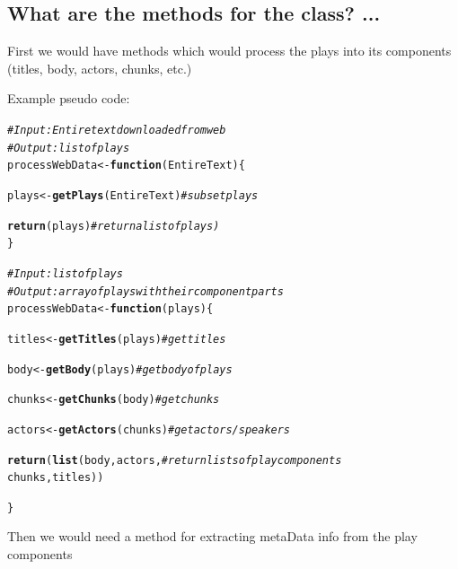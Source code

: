 \documentclass{article}\usepackage[]{graphicx}\usepackage[]{color}
\makeatletter
\newcommand{\hlcom}[1]{\textcolor[rgb]{0.678,0.584,0.686}{\textit{#1}}}%
\newcommand{\hlstd}[1]{\textcolor[rgb]{0.345,0.345,0.345}{#1}}%
\newcommand{\hlkwa}[1]{\textcolor[rgb]{0.161,0.373,0.58}{\textbf{#1}}}%
\newcommand{\hlkwb}[1]{\textcolor[rgb]{0.69,0.353,0.396}{#1}}%
\newcommand{\hlkwc}[1]{\textcolor[rgb]{0.333,0.667,0.333}{#1}}%
\newcommand{\hlkwd}[1]{\textcolor[rgb]{0.737,0.353,0.396}{\textbf{#1}}}%
\newenvironment{kframe}{%
 \def\at@end@of@kframe{}%
 \ifinner\ifhmode%
  \def\at@end@of@kframe{\end{minipage}}%
  \begin{minipage}{\columnwidth}%
 \fi\fi%
 \def\FrameCommand##1{\hskip\@totalleftmargin \hskip-\fboxsep
 \colorbox{shadecolor}{##1}\hskip-\fboxsep
     \hskip-\linewidth \hskip-\@totalleftmargin \hskip\columnwidth}%
 \MakeFramed {\advance\hsize-\width
   \@totalleftmargin\z@ \linewidth\hsize
   \@setminipage}}%
 {\par\unskip\endMakeFramed%
 \at@end@of@kframe}
\newenvironment{knitrout}{}{} %
\makeatother
\begin{document}
\subsection{What are the methods for the class? ...} %

First we would have methods which would process the plays into its components (titles, body, actors, chunks, etc.)

Example pseudo code:

\begin{knitrout}
\color{fgcolor}\begin{kframe}
\begin{alltt}
\hlcom{#Input: Entire text downloaded from web}
\hlcom{#Output: list of plays}
\hlstd{processWebData} \hlkwb{<-} \hlkwa{function}\hlstd{(}\hlkwc{EntireText}\hlstd{) \{}

    \hlstd{plays} \hlkwb{<-} \hlkwd{getPlays}\hlstd{(EntireText)}           \hlcom{#subset plays}

    \hlkwd{return}\hlstd{(plays)}                           \hlcom{#return a list of plays)   }
\hlstd{\}}

\hlcom{#Input: list of plays}
\hlcom{#Output: array of plays with their component parts}
\hlstd{processWebData} \hlkwb{<-} \hlkwa{function}\hlstd{(}\hlkwc{plays}\hlstd{) \{}

    \hlstd{titles} \hlkwb{<-} \hlkwd{getTitles}\hlstd{(plays)}              \hlcom{#get titles}

    \hlstd{body} \hlkwb{<-} \hlkwd{getBody}\hlstd{(plays)}                  \hlcom{#get body of plays}

    \hlstd{chunks} \hlkwb{<-} \hlkwd{getChunks}\hlstd{(body)}               \hlcom{#get chunks}

    \hlstd{actors} \hlkwb{<-} \hlkwd{getActors}\hlstd{(chunks)}             \hlcom{#get actors/speakers}

    \hlkwd{return}\hlstd{(}\hlkwd{list}\hlstd{(body, actors,}               \hlcom{#return lists of play components}
                \hlstd{chunks, titles))}

\hlstd{\}}
\end{alltt}
\end{kframe}
\end{knitrout}
Then we would need a method for extracting metaData info from the play components
\end{document}
